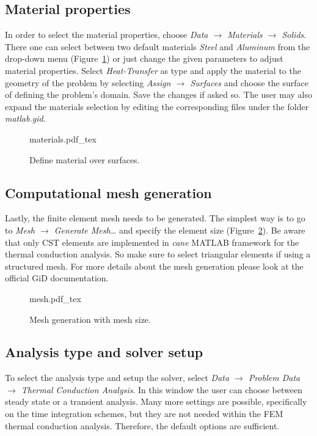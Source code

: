 \documentclass[10pt,a4paper]{article}
\begin{document}
\subsection{Material properties}

In order to select the material properties, choose \textit{Data $\rightarrow$ Materials $\rightarrow$ Solids}. There one can select between two default materials \textit{Steel} and \textit{Aluminum} from the drop-down menu (Figure~\ref{im:materials}) or just change the given parameters to adjust material properties. Select \textit{Heat-Transfer} as type and apply the material to the geometry of the problem by selecting \textit{Assign $\rightarrow$ Surfaces} and choose the surface of defining the problem’s domain. Save the changes if asked so. The user may also expand the materials selection by editing the corresponding files under the folder \textit{matlab.gid}.

\begin{figure}[ht]
	\centering
	\footnotesize
    \def\svgwidth{0.9\textwidth}{materials.pdf_tex}
	\caption{Define material over surfaces.}
	\label{im:materials}
\end{figure}


\subsection{Computational mesh generation}

Lastly, the finite element mesh needs to be generated. The simplest way is to go to \textit{Mesh $\rightarrow$ Generate Mesh…} and specify the element size (Figure~\ref{im:mesh}). Be aware that only CST elements are implemented in \textit{cane} MATLAB framework for the thermal conduction analysis. So make sure to select triangular elements if using a structured mesh. For more details about the mesh generation please look at the official GiD documentation.

\begin{figure}[ht]
	\centering
	\footnotesize
    \def\svgwidth{0.8\textwidth}{mesh.pdf_tex}
	\caption{Mesh generation with mesh size.}
	\label{im:mesh}
\end{figure}


\subsection{Analysis type and solver setup}

To select the analysis type and setup the solver, select \textit{Data $\rightarrow$ Problem Data $\rightarrow$ Thermal Conduction Analysis}. In this window the user can choose between steady state or a transient analysis. Many more settings are possible, specifically on the time integration schemes, but they are not needed within the FEM thermal conduction analysis. Therefore, the default options are sufficient.
\end{document}
